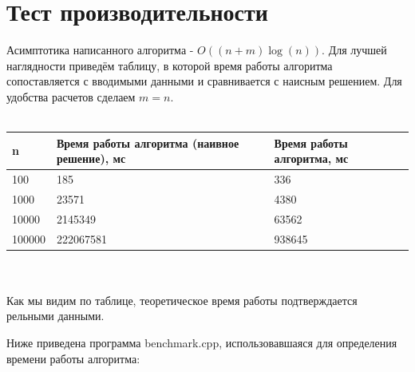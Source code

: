 \documentclass[12pt]{article}
\begin{document}
\section*{Тест производительности}
Асимптотика написанного алгоритма - $O((n+m) \log(n))$.
Для лучшей наглядности приведём таблицу, в которой время работы алгоритма сопоставляется с вводимыми данными и сравнивается с наисным решением. Для удобства расчетов сделаем $m = n$.
\\
\\
\begin{tabularx}{\textwidth}{ |X|X|X| }
    \hline
    n & Время работы алгоритма (наивное решение), мс & Время работы алгоритма, мс \\
    \hline
    100 & 185 & 336 \\
    1000 & 23571 & 4380 \\
    10000 & 2145349 & 63562 \\
    100000 & 222067581 & 938645 \\
    \hline
\end{tabularx}
\\
\\
Как мы видим по таблице, теоретическое время работы подтверждается рельными данными.  


Ниже приведена программа benchmark.cpp, использовавшаяся для определения времени работы алгоритма:
\end{document}
